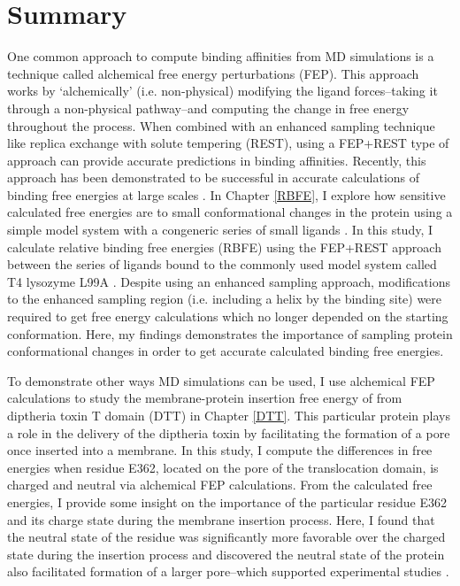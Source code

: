 \section*{Summary}
One common approach to compute binding affinities from MD simulations is a technique called alchemical free energy perturbations (FEP).
This approach works by `alchemically' (i.e. non-physical) modifying the ligand forces--taking it through a non-physical pathway--and computing the change in free energy throughout the process.
When combined with an enhanced sampling technique like replica exchange with solute tempering (REST), using a FEP+REST type of approach can provide accurate predictions in binding affinities.
Recently, this approach has been demonstrated to be successful in accurate calculations of binding free energies at large scales \cite{FEPplus}.
In Chapter \ref{RBFE}, I explore how sensitive calculated free energies are to small conformational changes in the protein using a simple model system with a congeneric series of small ligands \cite{Merski2015}.
In this study, I calculate relative binding free energies (RBFE) using the FEP+REST approach between the series of ligands bound to the commonly used model system called T4 lysozyme L99A \cite{lim2016sensitivity}.
Despite using an enhanced sampling approach, modifications to the enhanced sampling region (i.e. including a helix by the binding site) were required to get free energy calculations which no longer depended on the starting conformation.
Here, my findings demonstrates the importance of sampling protein conformational changes in order to get accurate calculated binding free energies.

To demonstrate other ways MD simulations can be used, I use alchemical FEP calculations to study the membrane-protein insertion free energy of from diptheria toxin T domain (DTT) in Chapter \ref{DTT}. 
This particular protein plays a role in the delivery of the diptheria toxin by facilitating the formation of a pore once inserted into a membrane.
In this study, I compute the differences in free energies when residue E362, located on the pore of the translocation domain, is charged and neutral via alchemical FEP calculations.
From the calculated free energies, I provide some insight on the importance of the particular residue E362 and its charge state during the membrane insertion process.
Here, I found that the neutral state of the residue was significantly more favorable over the charged state during the insertion process and discovered the neutral state of the protein also facilitated formation of a larger pore--which supported experimental studies \cite{Kyrychenko2018}.

